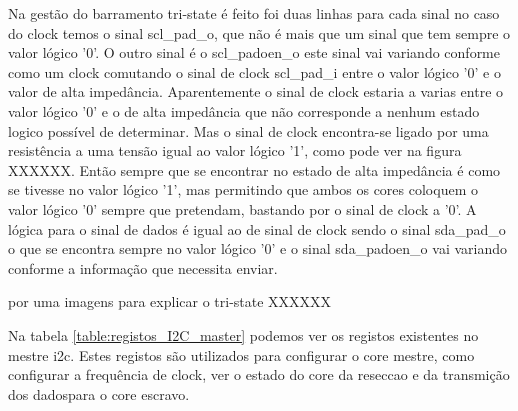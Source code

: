 Na gestão do barramento tri-state é feito foi duas linhas para cada sinal no caso do clock temos o sinal scl\_pad\_o, que não é mais que um sinal que tem sempre o valor lógico '0'. O outro sinal é o scl\_padoen\_o este sinal vai variando conforme como um clock comutando o sinal de clock scl\_pad\_i entre o valor lógico '0' e o valor de alta impedância. Aparentemente o sinal de clock estaria a varias entre o valor lógico '0' e o de alta impedância que não corresponde a nenhum estado logico possível de determinar. Mas o sinal de clock encontra-se ligado por uma resistência a uma tensão igual ao valor lógico '1', como pode ver na figura XXXXXX. Então sempre que se encontrar no estado de alta impedância é como se tivesse no valor lógico '1', mas permitindo que ambos os cores coloquem o valor lógico '0' sempre que pretendam, bastando por o sinal de clock a '0'. A lógica para o sinal de dados é igual ao de sinal de clock sendo o sinal sda\_pad\_o o que se encontra sempre no valor lógico '0' e o sinal sda\_padoen\_o vai variando conforme a informação que necessita enviar.

por uma imagens para explicar o tri-state XXXXXX

Na tabela \ref{table:registos_I2C_master} podemos ver os registos existentes no mestre \acrshort{i2c}. Estes registos são utilizados para configurar o core mestre, como configurar a frequência de clock, ver o estado do core da reseccao e da transmição dos dadospara o core escravo. 

